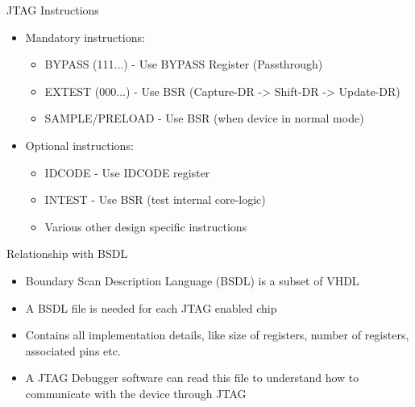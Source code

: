 \documentclass{beamer}
\begin{document}
\begin{frame}{JTAG Instructions}
    \begin{itemize}
    \item Mandatory instructions:
        \begin{itemize}
        \item BYPASS (111...) - Use BYPASS Register (Passthrough)
        \item EXTEST (000...) - Use BSR (Capture-DR -> Shift-DR -> Update-DR)
        \item SAMPLE/PRELOAD - Use BSR (when device in normal mode)
        \end{itemize}
    \item Optional instructions:
        \begin{itemize}
        \item IDCODE - Use IDCODE register 
        \item INTEST - Use BSR (test internal core-logic)
        \item Various other design specific instructions
        \end{itemize}
    \end{itemize}
\end{frame}

\begin{frame}{Relationship with BSDL}
    \begin{itemize}
    \item Boundary Scan Description Language (BSDL) is a subset of VHDL
    \item A BSDL file is needed for each JTAG enabled chip
    \item Contains all implementation details, like size of registers, number of registers,
        associated pins etc.
    \item A JTAG Debugger software can read this file to understand how to communicate
        with the device through JTAG
    \end{itemize}
\end{frame}
\end{document}
